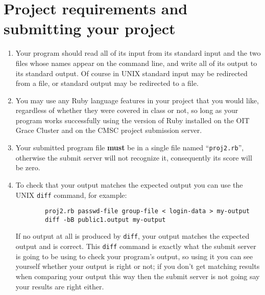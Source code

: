 \documentclass[11pt]{article}
\begin{document}
    \vspace{-3.5mm}

  \section{Project requirements and submitting your project}

    \begin{enumerate}

      \addtolength{\itemsep}{-.5mm}

      \item Your program should read all of its input from its standard
            input and the two files whose names appear on the command line,
            and write all of its output to its standard output.  Of course
            in UNIX standard input may be redirected from a file, or
            standard output may be redirected to a file.

      \item You may use any Ruby language features in your project that you
            would like, regardless of whether they were covered in class or
            not, so long as your program works successfully using the
            version of Ruby installed on the OIT Grace Cluster and on the
            CMSC project submission server.

      \item Your submitted program file \textbf{must} be in a single file
            named ``\texttt{proj2.rb}'', otherwise the submit server will
            not recognize it, consequently its score will be zero.

      \item To check that your output matches the expected output you can
            use the UNIX \texttt{diff} command, for example:

            \begin{centering}

              \begin{BVerbatim}
        proj2.rb passwd-file group-file < login-data > my-output
        diff -bB public1.output my-output
              \end{BVerbatim}

            \end{centering}

            \smallskip

            If no output at all is produced by \texttt{diff}, your output
            matches the expected output and is correct.  This \texttt{diff}
            command is exactly what the submit server is going to be using
            to check your program's output, so using it you can see yourself
            whether your output is right or not; if you don't get matching
            results when comparing your output this way then the submit
            server is not going say your results are right either.


\end{enumerate}
\end{document}
